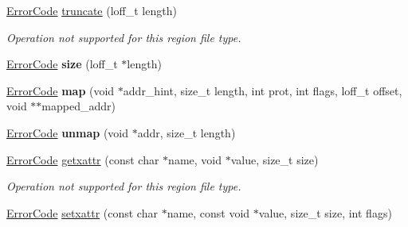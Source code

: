 \begin{DoxyCompactItemize}
\item 
\hyperlink{group__ERRORCODES_ga6263a3c9a0b8d36aea21cdd835ac99fe}{Error\+Code} \hyperlink{classalps_1_1MultiRegionFile_af330f12ef62f3a140130ef5c58370513}{truncate} (loff\+\_\+t length)\hypertarget{classalps_1_1MultiRegionFile_af330f12ef62f3a140130ef5c58370513}{}\label{classalps_1_1MultiRegionFile_af330f12ef62f3a140130ef5c58370513}

\begin{DoxyCompactList}\small\item\em Operation not supported for this region file type. \end{DoxyCompactList}\item 
\hyperlink{group__ERRORCODES_ga6263a3c9a0b8d36aea21cdd835ac99fe}{Error\+Code} {\bfseries size} (loff\+\_\+t $\ast$length)\hypertarget{classalps_1_1MultiRegionFile_a083ab071bc83e2f9e647e978d0afa0c1}{}\label{classalps_1_1MultiRegionFile_a083ab071bc83e2f9e647e978d0afa0c1}

\item 
\hyperlink{group__ERRORCODES_ga6263a3c9a0b8d36aea21cdd835ac99fe}{Error\+Code} {\bfseries map} (void $\ast$addr\+\_\+hint, size\+\_\+t length, int prot, int flags, loff\+\_\+t offset, void $\ast$$\ast$mapped\+\_\+addr)\hypertarget{classalps_1_1MultiRegionFile_adce5e1dde0d9b3b2f170f7c5d9cd2718}{}\label{classalps_1_1MultiRegionFile_adce5e1dde0d9b3b2f170f7c5d9cd2718}

\item 
\hyperlink{group__ERRORCODES_ga6263a3c9a0b8d36aea21cdd835ac99fe}{Error\+Code} {\bfseries unmap} (void $\ast$addr, size\+\_\+t length)\hypertarget{classalps_1_1MultiRegionFile_a0dedb7bee4b25f26f0f86bdf40dac35b}{}\label{classalps_1_1MultiRegionFile_a0dedb7bee4b25f26f0f86bdf40dac35b}

\item 
\hyperlink{group__ERRORCODES_ga6263a3c9a0b8d36aea21cdd835ac99fe}{Error\+Code} \hyperlink{classalps_1_1MultiRegionFile_ab1121b16b2a12746f87fb5c1af75ad52}{getxattr} (const char $\ast$name, void $\ast$value, size\+\_\+t size)\hypertarget{classalps_1_1MultiRegionFile_ab1121b16b2a12746f87fb5c1af75ad52}{}\label{classalps_1_1MultiRegionFile_ab1121b16b2a12746f87fb5c1af75ad52}

\begin{DoxyCompactList}\small\item\em Operation not supported for this region file type. \end{DoxyCompactList}\item 
\hyperlink{group__ERRORCODES_ga6263a3c9a0b8d36aea21cdd835ac99fe}{Error\+Code} \hyperlink{classalps_1_1MultiRegionFile_a610085fd92e3e5effb9ba6c872981831}{setxattr} (const char $\ast$name, const void $\ast$value, size\+\_\+t size, int flags)\hypertarget{classalps_1_1MultiRegionFile_a610085fd92e3e5effb9ba6c872981831}{}\label{classalps_1_1MultiRegionFile_a610085fd92e3e5effb9ba6c872981831}


\end{DoxyCompactItemize}
